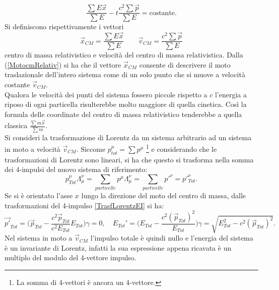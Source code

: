 \begin{equation}
    \frac{\sum E \vec{x}}{\sum E}- t\frac{c^2\sum\vec{p}}{\sum E}=\text{costante}.\label{MotocmRelativ}
\end{equation}
Si definiscono rispettivamente i vettori
\begin{equation}
    \vec x_{CM}=\frac{\sum E \vec{x}}{\sum E} \qquad \vec v_{CM}=\frac{c^2\sum\vec{p}}{\sum E}\label{cmRelativ}
\end{equation}
centro di massa relativistico e velocità del centro di massa relativistica. Dalla (\ref{MotocmRelativ}) si ha che il vettore $\vec x_{CM}$ consente di descrivere il moto traslazionale dell'intero sistema come di un solo punto che si muove a velocità  costante $\vec v_{CM}$.\\
 Qualora le velocità dei punti del sistema fossero piccole rispetto a $c$ l'energia a riposo di ogni particella risulterebbe molto maggiore di quella cinetica. Così la formula delle coordinate del centro di massa relativistico tenderebbe a quella classica $\frac{\sum m\vec{x}}{\sum m}$.\\

Si consideri la trasformazione di Lorentz da un sistema arbitrario ad un sistema in moto a velocità $\vec v_{CM}$. Siccome $p_{tot}^\mu=\sum p^\mu$ \footnote{La somma di 4-vettori è ancora un 4-vettore.} e considerando che le trasformazioni di Lorentz sono lineari, si ha che questo si trasforma nella somma dei 4-impulsi del nuovo sistema di riferimento:
\begin{equation*}
    p^\mu_{Tot}\Lambda_\mu^\nu=\sum_{particelle} p^\mu\Lambda_\mu^\nu=\sum_{particelle} p'^\nu=p'^\nu_{Tot}.
\end{equation*}
Se si è orientato l'asse $x$ lungo la direzione del moto del centro di massa, dalle trasformazioni del 4-impulso \eqref{TrasfLorentzEI} si ha:
\begin{equation*}
    \vec{p'}_{Tot}=\bigg( \vec{p}_{Tot}-\frac{c^2 \vec{p}_{Tot}}{c^2 E_{Tot}}E_{Tot}\bigg)\gamma=0, \quad E_{Tot}'=\bigg(E_{Tot}-\frac{c^2(\vec{p}_{Tot})^2}{E_{Tot}}\bigg)\gamma=\sqrt{E^2_{Tot}-c^2(\vec{p}_{Tot})^2}. 
\end{equation*}
Nel sistema in moto a $\vec v_{CM}$ l'impulso totale è quindi nullo e l'energia del sistema è un invariante di Lorentz, infatti la sua espressione appena ricavata è un multiplo del modulo del 4-vettore impulso.